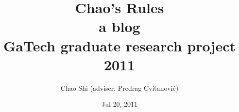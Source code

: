 
        \title{
\Huge
Chao's Rules
\\
\huge
a blog
\\
{\LARGE GaTech graduate research project 2011}
        \\\vspace{1.0cm}
        }\author{
Chao Shi
(adviser: Predrag Cvitanovi\'{c})
    }
        \date{Jul 20, 2011} \Private{\date{\today}}
